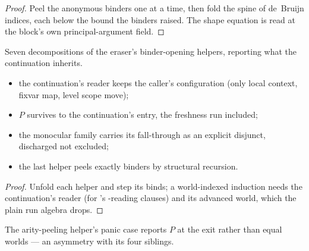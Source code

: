 \begin{proof}
\leanok
{}
 Peel the anonymous binders one at a time, then fold the spine of de~Bruijn indices, each
below the bound the binders raised. The shape equation is  read at the
block's own principal-argument field.
\end{proof}
\begin{lemma}
\label{lem:run_withLocalDecl_okW}
\leanok
{}
 Seven decompositions of the eraser's binder-opening helpers, reporting what the
continuation inherits.
\begin{itemize}
\item the continuation's reader keeps the caller's configuration (only local context, fixvar map, level
scope move);
\item $P$ survives to the continuation's entry, the freshness run included;
\item the monocular family carries its  fall-through as an explicit disjunct, discharged
not excluded;
\item the last helper peels exactly  binders by structural recursion.
\end{itemize}
\end{lemma}
\begin{proof}
\leanok
{}
 Unfold each helper and step its binds; a world-indexed induction needs the continuation's
reader (for 's -reading clauses) and its advanced world, which the plain run
algebra drops.
\end{proof}
\begin{remark}
 The arity-peeling helper's panic case reports $P$ at the exit rather than equal worlds
--- an asymmetry with its four siblings.
\end{remark}

